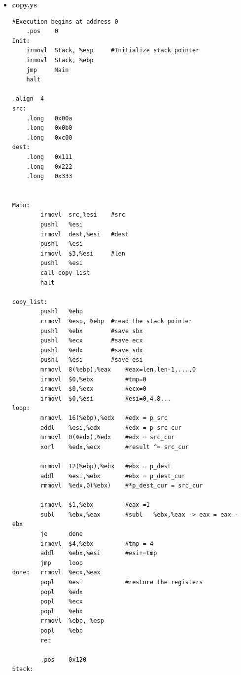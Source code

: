 \documentclass{article}
\begin{document}
\begin{itemize}
\begin{lstlisting}[caption={}]
loop:	
		mrmovl	16(%ebp),%edx	#edx = p_src
		addl	%esi,%edx		#edx = p_src_cur
		mrmovl	0(%edx),%edx	#edx = src_cur
		xorl	%edx,%ecx		#result ^= src_cur

		mrmovl	12(%ebp),%ebx	#ebx = p_dest
		addl	%esi,%ebx		#ebx = p_dest_cur
		rmmovl	%edx,0(%ebx)	#*p_dest_cur = src_cur

		irmovl  $1,%ebx			#eax-=1
		subl	%ebx,%eax		#subl	%ebx,%eax -> eax = eax - ebx
		je		done
		irmovl	$4,%ebx			#tmp = 4
		addl	%ebx,%esi		#esi+=tmp
		jmp		loop
done:	rmmovl	%ecx,20(%ebp)	#*p_result = ecx
		popl	%esi			#restore the registers
		popl	%edx
		popl 	%ecx
		popl	%ebx
		popl	%eax
		rrmovl	%ebp, %esp
		popl	%ebp
		ret

		.pos	0x120
Stack:
   \end{lstlisting}

\item \textbf{copy.ys}
  \begin{lstlisting}[caption={}]
#Execution begins at address 0
	.pos	0
Init:
	irmovl	Stack, %esp		#Initialize stack pointer
	irmovl	Stack, %ebp
	jmp		Main
	halt

.align	4
src:
	.long	0x00a
	.long	0x0b0
	.long	0xc00
dest:
	.long	0x111
	.long	0x222
	.long	0x333


Main:
		irmovl	src,%esi	#src
		pushl	%esi
		irmovl	dest,%esi	#dest
		pushl	%esi
		irmovl	$3,%esi		#len
		pushl	%esi
		call copy_list	
		halt

copy_list:
		pushl	%ebp
		rrmovl	%esp, %ebp	#read the stack pointer
		pushl	%ebx		#save sbx
		pushl	%ecx		#save ecx
		pushl	%edx		#save sdx
		pushl	%esi		#save esi
		mrmovl	8(%ebp),%eax	#eax=len,len-1,...,0
		irmovl	$0,%ebx			#tmp=0
		irmovl	$0,%ecx			#ecx=0
		irmovl	$0,%esi			#esi=0,4,8...
loop:	
		mrmovl	16(%ebp),%edx	#edx = p_src
		addl	%esi,%edx		#edx = p_src_cur
		mrmovl	0(%edx),%edx	#edx = src_cur
		xorl	%edx,%ecx		#result ^= src_cur

		mrmovl	12(%ebp),%ebx	#ebx = p_dest
		addl	%esi,%ebx		#ebx = p_dest_cur
		rmmovl	%edx,0(%ebx)	#*p_dest_cur = src_cur

		irmovl  $1,%ebx			#eax-=1
		subl	%ebx,%eax		#subl	%ebx,%eax -> eax = eax - ebx
		je		done
		irmovl	$4,%ebx			#tmp = 4
		addl	%ebx,%esi		#esi+=tmp
		jmp		loop
done:	rrmovl	%ecx,%eax
		popl	%esi			#restore the registers
		popl	%edx
		popl 	%ecx
		popl	%ebx
		rrmovl	%ebp, %esp
		popl	%ebp
		ret

		.pos	0x120
Stack:


   \end{lstlisting}
\end{itemize}
\end{document}
